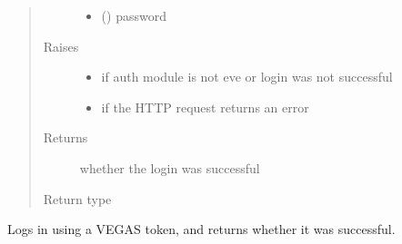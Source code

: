 \documentclass[letterpaper,10pt,english]{sphinxmanual}
\begin{document}
\begin{fulllineitems}
\begin{fulllineitems}
\begin{quote}
\begin{description}
\begin{itemize}
\item {} 
\sphinxAtStartPar
{} () \textendash{} password

\end{itemize}

\item[{Raises}] \leavevmode\begin{itemize}
\item {} 
\sphinxAtStartPar
{\hyperref[\detokenize{autoapi/pine/client/exceptions/index:pine.client.exceptions.PineClientAuthException}]{}} \textendash{} if auth module is not eve or login was not successful

\item {} 
\sphinxAtStartPar
{\hyperref[\detokenize{autoapi/pine/client/exceptions/index:pine.client.exceptions.PineClientHttpException}]{}} \textendash{} if the HTTP request returns an error

\end{itemize}

\item[{Returns}] \leavevmode
\sphinxAtStartPar
whether the login was successful

\item[{Return type}] \leavevmode
\sphinxAtStartPar
{}

\end{description}\end{quote}

\end{fulllineitems}


\begin{fulllineitems}
\label{\detokenize{autoapi/pine/client/index:pine.client.PineClient.authorize_vegas}}
\sphinxAtStartPar
Logs in using a VEGAS token, and returns whether it was successful.


\end{fulllineitems}
\end{fulllineitems}
\end{document}
